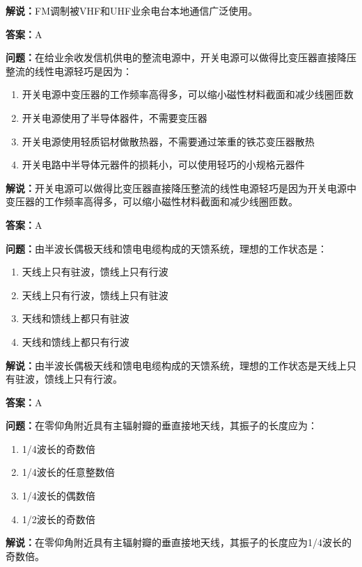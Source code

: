 \textbf{解说：}FM调制被VHF和UHF业余电台本地通信广泛使用。%

\textbf{答案：}A

\textbf{问题：}在给业余收发信机供电的整流电源中，开关电源可以做得比变压器直接降压整流的线性电源轻巧是因为：

\begin{enumerate}[label=\Alph*), leftmargin=1cm]
	\item 开关电源中变压器的工作频率高得多，可以缩小磁性材料截面和减少线圈匝数
	\item 开关电源使用了半导体器件，不需要变压器
	\item 开关电源使用轻质铝材做散热器，不需要通过笨重的铁芯变压器散热
	\item 开关电路中半导体元器件的损耗小，可以使用轻巧的小规格元器件
\end{enumerate}

\textbf{解说：}开关电源可以做得比变压器直接降压整流的线性电源轻巧是因为开关电源中变压器的工作频率高得多，可以缩小磁性材料截面和减少线圈匝数。%

\textbf{答案：}A

\textbf{问题：}由半波长偶极天线和馈电电缆构成的天馈系统，理想的工作状态是：

\begin{enumerate}[label=\Alph*), leftmargin=1cm]
	\item 天线上只有驻波，馈线上只有行波
	\item 天线上只有行波，馈线上只有驻波
	\item 天线和馈线上都只有驻波
	\item 天线和馈线上都只有行波
\end{enumerate}

\textbf{解说：}由半波长偶极天线和馈电电缆构成的天馈系统，理想的工作状态是天线上只有驻波，馈线上只有行波。%

\textbf{答案：}A

\textbf{问题：}在零仰角附近具有主辐射瓣的垂直接地天线，其振子的长度应为：

\begin{enumerate}[label=\Alph*), leftmargin=1cm]
	\item 1/4波长的奇数倍
	\item 1/4波长的任意整数倍
	\item 1/4波长的偶数倍
	\item 1/2波长的奇数倍
\end{enumerate}

\textbf{解说：}在零仰角附近具有主辐射瓣的垂直接地天线，其振子的长度应为1/4波长的奇数倍。%

